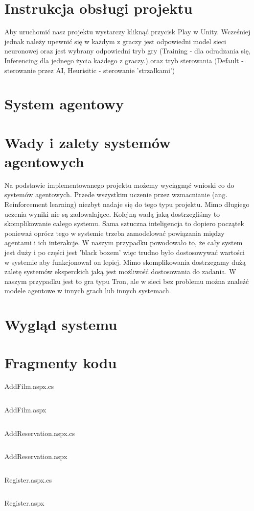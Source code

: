 \documentclass[12pt,a4paper]{article}
\begin{document}
\section{Instrukcja obsługi projektu}
Aby uruchomić nasz projektu wystarczy kliknąć przycisk Play w Unity. Wcześniej jednak należy upewnić się w każdym z graczy jest odpowiedni model sieci neuronowej oraz jest wybrany odpowiedni tryb gry (Training - dla odradzania się, Inferencing dla jednego życia każdego z graczy.) oraz tryb sterowania (Default - sterowanie przez AI, Heurisitic - sterowanie 'strzałkami') 

\section{System agentowy}

\section{Wady i zalety systemów agentowych}
Na podstawie implementowanego projektu możemy wyciągnąć wnioski co do systemów agentowych. Przede wszystkim uczenie przez wzmacnianie (ang. Reinforcement learning) niezbyt nadaje się do tego typu projektu. Mimo długiego uczenia wyniki nie są zadowalające. Kolejną wadą jaką dostrzegliśmy to skomplikowanie całego systemu. Sama sztuczna inteligencja to dopiero początek ponieważ oprócz tego w systemie trzeba zamodelować powiązania między agentami i ich interakcje. W naszym przypadku powodowało to, że cały system jest duży i po części jest 'black boxem' więc trudno było dostosowywać wartości w systemie aby funkcjonował on lepiej. Mimo skomplikowania dostrzegamy dużą zaletę systemów eksperckich jaką jest możliwość dostosowania do zadania. W naszym przypadku jest to gra typu Tron, ale w sieci bez problemu można znaleźć modele agentowe w innych grach lub innych systemach. 

\section{Wygląd systemu}


\section{Fragmenty kodu}
AddFilm.aspx.cs
\begin{lstlisting}

\end{lstlisting}

AddFilm.aspx
\begin{lstlisting}

\end{lstlisting}

AddReservation.aspx.cs
\begin{lstlisting}

\end{lstlisting}
AddReservation.aspx
\begin{lstlisting}

\end{lstlisting}
Register.aspx.cs
\begin{lstlisting}

\end{lstlisting}
Register.aspx
\begin{lstlisting}

\end{lstlisting}
\end{document}
